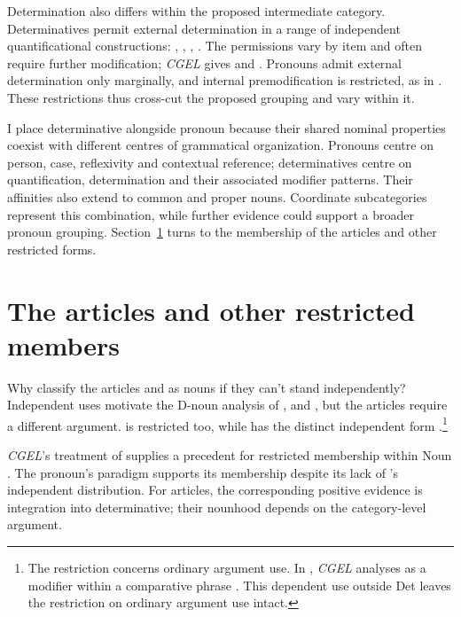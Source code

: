 \documentclass[12pt]{article}
\begin{document}
Determination also differs within the proposed intermediate category. Determinatives permit external determination in a range of independent quantificational constructions: , , , . The permissions vary by item and often require further modification; \textit{CGEL} gives  and  \citep[415--416]{huddleston2002}. Pronouns admit external determination only marginally, and internal premodification is restricted, as in  \citep[429--430]{huddleston2002}. These restrictions thus cross-cut the proposed grouping and vary within it.

I place determinative alongside pronoun because their shared nominal properties coexist with different centres of grammatical organization. Pronouns centre on person, case, reflexivity and contextual reference; determinatives centre on quantification, determination and their associated modifier patterns. Their affinities also extend to common and proper nouns. Coordinate subcategories represent this combination, while further evidence could support a broader pronoun grouping. Section~\ref{sec:articles} turns to the membership of the articles and other restricted forms.

\section{The articles and other restricted members}\label{sec:articles}

Why classify the articles  and  as nouns if they can't stand independently? Independent uses motivate the D-noun analysis of ,  and , but the articles require a different argument.  is restricted too, while  has the distinct independent form  \citep[371--372, 410--411]{huddleston2002}.\footnote{The restriction concerns ordinary argument use. In , \textit{CGEL} analyses  as a modifier within a comparative phrase \citep[1131--1132, 1135--1136]{huddleston2002}. This dependent use outside Det leaves the restriction on ordinary argument use intact.}

\textit{CGEL}'s treatment of  supplies a precedent for restricted membership within Noun \citep[470--471]{huddleston2002}. The pronoun's paradigm supports its membership despite its lack of 's independent distribution. For articles, the corresponding positive evidence is integration into determinative; their nounhood depends on the category-level argument.
\end{document}
